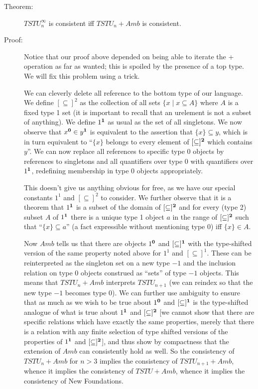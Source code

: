 \documentclass[12pt]{book}
\begin{document}
\begin{description}

\item[Theorem:] $TSTU_n^{\infty}$ is consistent iff $TSTU_n + Amb$ is
consistent.

\item[Proof:] Notice that our proof above depended on being able to
iterate the + operation as far as wanted; this is spoiled by the
presence of a top type.  We will fix this problem using a trick.

We can cleverly delete all reference to the bottom type of our
language.  We define $[\subseteq]^2$ as the collection of all sets
$\{x \mid x \subseteq A\}$ where $A$ is a fixed type 1 set (it is
important to recall that an urelement is not a subset of anything).
We define $1^{\bf 1}$ as usual as the set of all singletons.  We now observe
that $x^{\bf 0} \in y^{\bf 1}$ is equivalent to the assertion that
$\{x\} \subseteq y$, which is in turn equivalent to ``$\{x\}$ belongs
to every element of $[\subseteq]^{\bf 2}$ which contains $y$''.  We can now
replace all references to specific type 0 objects by references to
singletons and all quantifiers over type 0 with quantifiers over
$1^{\bf 1}$, redefining membership in type 0 objects appropriately.

This doesn't give us anything obvious for free, as we have our special
constants $1^1$ and $[\subseteq]^2$ to consider.  We further observe
that it is a theorem that $1^{\bf 1}$ is a subset of the domain of
$[\subseteq]^{\bf 2}$ and for every (type 2) subset $A$ of $1^{\bf 1}$
there is a unique type 1 object $a$ in the range of $[\subseteq]^{\bf
2}$ such that ``$\{x\} \subseteq a$'' (a fact expressible without
mentioning type 0) iff $\{x\} \in A$. 

Now $Amb$ tells us that there are objects $1^{\bf 0}$ and
$[\subseteq]^{\bf 1}$ with the type-shifted version of the same
property noted above for $1^1$ and $[\subseteq]^1$.  These can be
reinterpreted as the singleton set on a new type $-1$ and the
inclusion relation on type 0 objects construed as ``sets'' of type
$-1$ objects.  This means that $TSTU_n + Amb$ interprets $TSTU_{n+1}$
(we can reindex so that the new type $-1$ becomes type 0).  We can
further use ambiguity to ensure that as much as we wish to be true
about $1^{\bf 0}$ and $[\subseteq]^{\bf 1}$ is the type-shifted
analogue of what is true about $1^{\bf 1}$ and $[\subseteq]^{\bf 2}$
[we cannot show that there are specific relations which have exactly
the same properties, merely that there is a relation with any finite
selection of type shifted versions of the properties of $1^{\bf 1}$ and
$[\subseteq]^{\bf 2}$], and thus show by compactness that the extension of
$Amb$ can consistently hold as well.  So the consistency of $TSTU_n +
Amb$ for $n>3$ implies the consistency of $TSTU_{n+1} + Amb$, whence it
implies the consistency of $TSTU + Amb$, whence it implies the
consistency of New Foundations.


\end{description}
\end{document}
